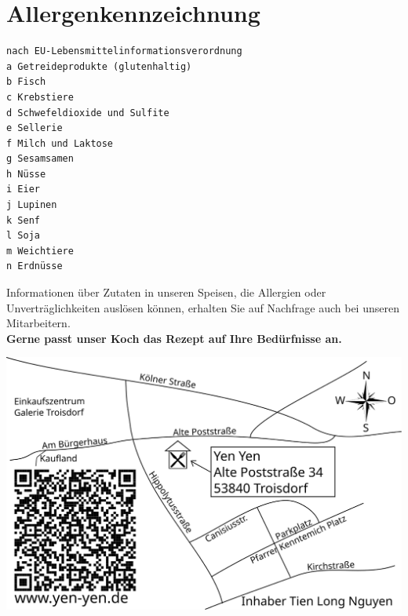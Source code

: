 \documentclass[12pt,a5paper,oneside]{scrreprt}
\begin{document}
\section*{Allergenkennzeichnung}
\begin{verbatim}
nach EU-Lebensmittelinformationsverordnung
a Getreideprodukte (glutenhaltig) 
b Fisch
c Krebstiere
d Schwefeldioxide und Sulfite 
e Sellerie
f Milch und Laktose
g Sesamsamen
h Nüsse
i Eier
j Lupinen
k Senf
l Soja
m Weichtiere
n Erdnüsse
\end{verbatim}
Informationen über Zutaten in unseren Speisen, die Allergien
oder Unverträglichkeiten auslösen können, erhalten Sie auf Nachfrage
auch bei unseren Mitarbeitern.\\ 
\textbf{Gerne passt unser Koch das Rezept auf Ihre Bedürfnisse an.} %
\begin{center}
\includegraphics[width=1.0\textwidth]{gfx/map/tdfcity}\\
\end{center}
\end{document}
